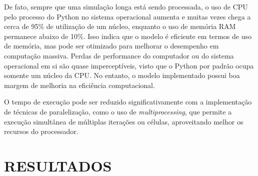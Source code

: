 \documentclass[12pt,oneside]{report}
\begin{document}
De fato, sempre que uma simulação longa está sendo processada, o uso de CPU pelo processo do Python no sistema operacional aumenta e muitas vezes chega a cerca de 95\% de utilização de um núcleo, enquanto o uso de memória RAM permanece abaixo de 10\%. Isso indica que o modelo é eficiente em termos de uso de memória, mas pode ser otimizado para melhorar o desempenho em computação massiva. Perdas de performance do computador ou do sistema operacional em si são quase imperceptíveis, visto que o Python por padrão ocupa somente um núcleo da CPU. No entanto, o modelo implementado possui boa margem de melhoria na eficiência computacional.

O tempo de execução pode ser reduzido significativamente com a implementação de técnicas de paralelização, como o uso de \textit{multiprocessing}, que permite a execução simultânea de múltiplas iterações ou células, aproveitando melhor os recursos do processador.




\chapter{RESULTADOS}
\end{document}
